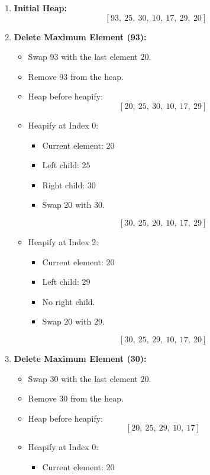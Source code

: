 \documentclass{cs1204}
\begin{document}
\begin{enumerate}[label=\textbf{\arabic*.}]
    \item \textbf{Initial Heap:}
    \[
    [93, \ 25, \ 30, \ 10, \ 17, \ 29, \ 20]
    \]
    
    \item \textbf{Delete Maximum Element (93):}
    \begin{itemize}
        \item Swap \(93\) with the last element \(20\).
        \item Remove \(93\) from the heap.
        \item Heap before heapify:
        \[
        [20, \ 25, \ 30, \ 10, \ 17, \ 29]
        \]
        \item Heapify at Index 0:
        \begin{itemize}
            \item Current element: \(20\)
            \item Left child: \(25\)
            \item Right child: \(30\)
            \item Swap \(20\) with \(30\).
        \end{itemize}
        \[
        [30, \ 25, \ 20, \ 10, \ 17, \ 29]
        \]
        \item Heapify at Index 2:
        \begin{itemize}
            \item Current element: \(20\)
            \item Left child: \(29\)
            \item No right child.
            \item Swap \(20\) with \(29\).
        \end{itemize}
        \[
        [30, \ 25, \ 29, \ 10, \ 17, \ 20]
        \]
    \end{itemize}
    \item \textbf{Delete Maximum Element (30):}
    \begin{itemize}
        \item Swap \(30\) with the last element \(20\).
        \item Remove \(30\) from the heap.
        \item Heap before heapify:
        \[
        [20, \ 25, \ 29, \ 10, \ 17]
        \]
        \item Heapify at Index 0:
        \begin{itemize}
            \item Current element: \(20\)

\end{itemize}
\end{itemize}
\end{enumerate}
\end{document}
